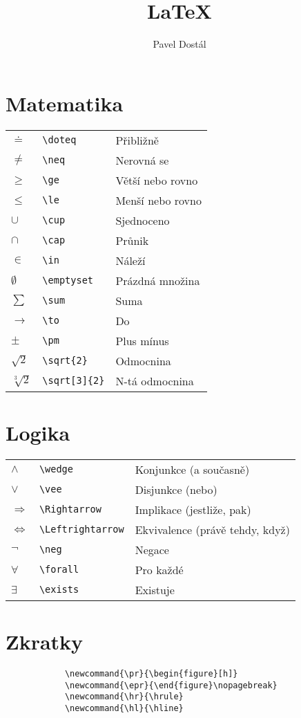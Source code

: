 \documentclass{article}
\title{LaTeX}
\author{Pavel Dostál}
\newcommand{\hl}{\hline}
\begin{document}
	\pagestyle{empty}
	\begin{multicols}{2}
		\section{Matematika}
		\begin{tabular}{lll}
			$\doteq$		&	\verb|\doteq|		&	Přibližně			\\
			$\neq$		&	\verb|\neq|		&	Nerovná se		\\
			$\ge$		&	\verb|\ge|			&	Větší nebo rovno	\\
			$\le$			&	\verb|\le|			&	Menší nebo rovno	\\
			$\cup$		&	\verb|\cup|			&	Sjednoceno		\\
			$\cap$		&	\verb|\cap|			&	Průnik			\\
			$\in$			&	\verb|\in|			&	Náleží			\\
			$\emptyset$	&	\verb|\emptyset|	&	Prázdná množina	\\
			$\sum$		&	\verb|\sum|		&	Suma			\\
			$\to$			&	\verb|\to|			&	Do				\\
			$\pm$		&	\verb|\pm|			&	Plus mínus		\\
			$\sqrt{2}$		&	\verb|\sqrt{2}|		&	Odmocnina		\\
			$\sqrt[3]{2}$	&	\verb|\sqrt[3]{2}|	&	N-tá odmocnina	
		\end{tabular}
		\section{Logika}
		\begin{tabular}{lll}
			$\wedge$			&	\verb|\wedge|			&	Konjunkce (a současně)			\\
			$\vee$			&	\verb|\vee|				&	Disjunkce (nebo)				\\
			$\Rightarrow$		&	\verb|\Rightarrow|		&	Implikace (jestliže, pak)			\\
			$\Leftrightarrow$	&	\verb|\Leftrightarrow|		&	Ekvivalence (právě tehdy, když)	\\
			$\neg$			&	\verb|\neg|			&	Negace						\\
			$\forall$			&	\verb|\forall|			&	Pro každé						\\
			$\exists$			&	\verb|\exists|			&	Existuje 
		\end{tabular}
		\columnbreak
		\section{Zkratky}
		\begin{verbatim}
			\newcommand{\pr}{\begin{figure}[h]}
			\newcommand{\epr}{\end{figure}\nopagebreak}
			\newcommand{\hr}{\hrule}
			\newcommand{\hl}{\hline}
		\end{verbatim}

\end{multicols}
\end{document}
